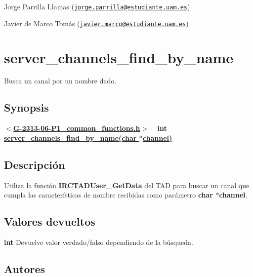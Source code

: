 \begin{DoxyItemize}
\item Jorge Parrilla Llamas (\href{mailto:jorge.parrilla@estudiante.uam.es}{\tt jorge.\+parrilla@estudiante.\+uam.\+es}) 
\item Javier de Marco Tomás (\href{mailto:javier.marco@estudiante.uam.es}{\tt javier.\+marco@estudiante.\+uam.\+es}) 
\end{DoxyItemize}\hypertarget{server_channels_find_by_name}{}\section{server\+\_\+channels\+\_\+find\+\_\+by\+\_\+name}\label{server_channels_find_by_name}
Busca un canal por un nombre dado.\hypertarget{server_channels_find_by_name_synopsis_server_users_find_by_name}{}\subsection{Synopsis}\label{server_channels_find_by_name_synopsis_server_users_find_by_name}
{ {\bfseries $<$\hyperlink{G-2313-06-P1__common__functions_8h}{G-\/2313-\/06-\/\+P1\+\_\+common\+\_\+functions.\+h}$>$} ~\newline
 {\bfseries int \hyperlink{G-2313-06-P1__common__functions_8c_a875ae5278d95716b494b26f96cf4ae6e}{server\+\_\+channels\+\_\+find\+\_\+by\+\_\+name(char $\ast$channel)}} } \hypertarget{server_channels_find_by_name_descripcion_server_channels_find_by_name}{}\subsection{Descripción}\label{server_channels_find_by_name_descripcion_server_channels_find_by_name}
Utiliza la función {\bfseries I\+R\+C\+T\+A\+D\+User\+\_\+\+Get\+Data} del T\+AD para buscar un canal que cumpla las características de nombre recibidas como parámetro {\bfseries char $\ast$channel}.\hypertarget{server_channels_find_by_name_return_server_channels_find_by_name}{}\subsection{Valores devueltos}\label{server_channels_find_by_name_return_server_channels_find_by_name}

\begin{DoxyItemize}
\item {\bfseries int} Devuelve valor verdado/falso dependiendo de la búsqueda. 
\end{DoxyItemize}\hypertarget{server_channels_find_by_name_authors_server_channels_find_by_name}{}\subsection{Autores}\label{server_channels_find_by_name_authors_server_channels_find_by_name}

